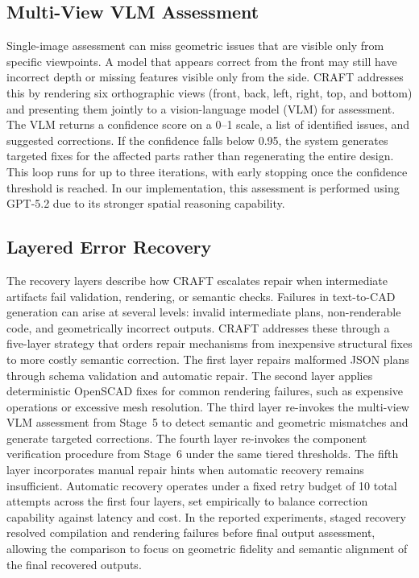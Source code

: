 \documentclass[conference]{IEEEtran}
\begin{document}
\subsection{Multi-View VLM Assessment}
\label{subSec:vlm}

Single-image assessment can miss geometric issues that are visible only from specific viewpoints. A model that appears correct from the front may still have incorrect depth or missing features visible only from the side. CRAFT addresses this by rendering six orthographic views (front, back, left, right, top, and bottom) and presenting them jointly to a vision-language model (VLM) for assessment. The VLM returns a confidence score on a 0--1 scale, a list of identified issues, and suggested corrections. If the confidence falls below 0.95, the system generates targeted fixes for the affected parts rather than regenerating the entire design. This loop runs for up to three iterations, with early stopping once the confidence threshold is reached. In our implementation, this assessment is performed using GPT-5.2 due to its stronger spatial reasoning capability.

\subsection{Layered Error Recovery}
\label{subSec:recovery}

The recovery layers describe how CRAFT escalates repair when intermediate artifacts fail validation, rendering, or semantic checks. Failures in text-to-CAD generation can arise at several levels: invalid intermediate plans, non-renderable code, and geometrically incorrect outputs. CRAFT addresses these through a five-layer strategy that orders repair mechanisms from inexpensive structural fixes to more costly semantic correction. The first layer repairs malformed JSON plans through schema validation and automatic repair. The second layer applies deterministic OpenSCAD fixes for common rendering failures, such as expensive operations or excessive mesh resolution. The third layer re-invokes the multi-view VLM assessment from Stage~5 to detect semantic and geometric mismatches and generate targeted corrections. The fourth layer re-invokes the component verification procedure from Stage~6 under the same tiered thresholds. The fifth layer incorporates manual repair hints when automatic recovery remains insufficient. Automatic recovery operates under a fixed retry budget of 10 total attempts across the first four layers, set empirically to balance correction capability against latency and cost. In the reported experiments, staged recovery resolved compilation and rendering failures before final output assessment, allowing the comparison to focus on geometric fidelity and semantic alignment of the final recovered outputs.
\end{document}
